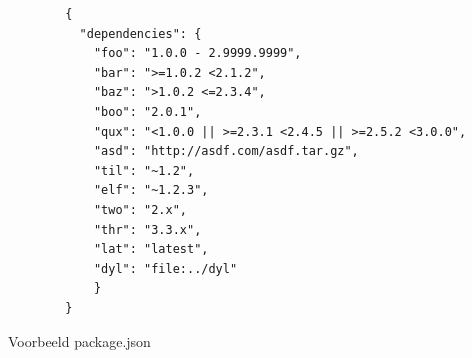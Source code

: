 \begin{listing}[H]
    \centering
    \begin{verbatim}
        {
          "dependencies": {
            "foo": "1.0.0 - 2.9999.9999",
            "bar": ">=1.0.2 <2.1.2",
            "baz": ">1.0.2 <=2.3.4",
            "boo": "2.0.1",
            "qux": "<1.0.0 || >=2.3.1 <2.4.5 || >=2.5.2 <3.0.0",
            "asd": "http://asdf.com/asdf.tar.gz",
            "til": "~1.2",
            "elf": "~1.2.3",
            "two": "2.x",
            "thr": "3.3.x",
            "lat": "latest",
            "dyl": "file:../dyl"
            }
        }
        \end{verbatim}
        \caption[Voorbeeld package.json]{\label{fig:packagejson}Voorbeeld package.json \autocite{Kaplan2024}}
\end{listing}

